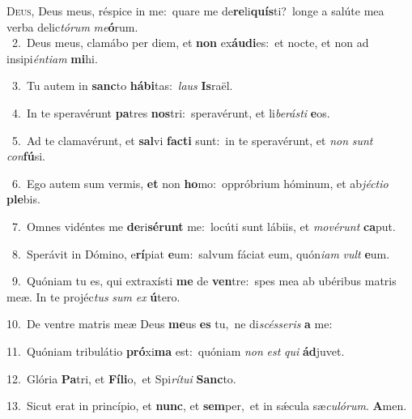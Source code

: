 \lettrine{\initial\textcolor{\initialcolor}{D}}{eus,} Deus meus, réspice in me:~\dagger quare me de\-\textbf{re}\-li\-\textbf{quís}\-ti?~\star longe a salúte mea verba delic\-\textit{tó}\-\textit{rum} \textit{me}\-\textbf{ó}rum.\\
{\numbfont\textcolor{\numbcolor}{~2.}}~Deus meus, clamábo per diem, et \textbf{non} ex\-\textbf{áu}\-\textbf{di}es:~\star et nocte, et non ad insipi\-\textit{én}\-\textit{ti}\textit{am} \textbf{mi}\-hi.\par
{\numbfont\textcolor{\numbcolor}{~3.}}~Tu autem in \textbf{sanc}\-to \textbf{há}\-\textbf{bi}tas:~\star \textit{laus} \textbf{Is}\-raël.\par
{\numbfont\textcolor{\numbcolor}{~4.}}~In te speravérunt \textbf{pa}\-tres \textbf{nos}\-tri:~\star speravérunt, et li\-\textit{be}\-\textit{rás}\textit{ti} \textbf{e}\-os.\par
{\numbfont\textcolor{\numbcolor}{~5.}}~Ad te clamavérunt, et \textbf{sal}\-vi \textbf{fac}\-\textbf{ti} sunt:~\star in te speravérunt, et \textit{non} \textit{sunt} \textit{con}\-\textbf{fú}si.\par
{\numbfont\textcolor{\numbcolor}{~6.}}~Ego autem sum vermis, \textbf{et} non \textbf{ho}\-mo:~\star oppróbrium hóminum, et ab\-\textit{jéc}\-\textit{ti}\textit{o} \textbf{ple}\-bis.\par
{\numbfont\textcolor{\numbcolor}{~7.}}~Omnes vidéntes me \textbf{de}\-ri\-\textbf{sé}\-\textbf{runt} me:~\star locúti sunt lábiis, et \textit{mo}\-\textit{vé}\textit{runt} \textbf{ca}\-put.\par
{\numbfont\textcolor{\numbcolor}{~8.}}~Sperávit in Dómino, e\-\textbf{rí}\-piat \textbf{e}\-um:~\star salvum fáciat eum, quón\-\textit{i}\-\textit{am} \textit{vult} \textbf{e}\-um.\par
{\numbfont\textcolor{\numbcolor}{~9.}}~Quóniam tu es, qui extraxísti \textbf{me} de \textbf{ven}\-tre:~\star spes mea ab ubéribus matris meæ. In te projéc\textit{tus} \textit{sum} \textit{ex} \textbf{ú}\-tero.\par
{\numbfont\textcolor{\numbcolor}{10.}}~De ventre matris meæ Deus \textbf{me}\-us \textbf{es} tu,~\star ne di\-\textit{scés}\-\textit{se}\textit{ris} \textbf{a} me:\par
{\numbfont\textcolor{\numbcolor}{11.}}~Quóniam tribulátio \textbf{pró}\-xi\textbf{ma} est:~\star quóniam \textit{non} \textit{est} \textit{qui} \textbf{ád}\-juvet.\par
{\numbfont\textcolor{\numbcolor}{12.}}~Glória \textbf{Pa}\-tri, et \textbf{Fí}\-\textbf{li}o,~\star et Spi\-\textit{rí}\-\textit{tu}\textit{i} \textbf{Sanc}\-to.\par
{\numbfont\textcolor{\numbcolor}{13.}}~Sicut erat in princípio, et \textbf{nunc}\-, et \textbf{sem}\-per,~\star et in sǽcula sæ\-\textit{cu}\-\textit{ló}\textit{rum}. \textbf{A}\-men.\par
